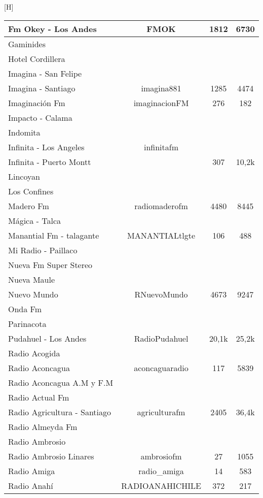 \begin{center}[H]
\begin{longtable}{| l | c | c | c |}
Fm Okey - Los Andes	&	FMOK	&	1812	&	6730	\\ \hline
Gaminides	&		&		&		\\ \hline
Hotel Cordillera	&		&		&		\\ \hline
Imagina - San Felipe	&		&		&		\\ \hline
Imagina - Santiago	&	imagina881	&	1285	&	4474	\\ \hline
Imaginación Fm	&	imaginacionFM	&	276	&	182	\\ \hline
Impacto - Calama	&		&		&		\\ \hline
Indomita	&		&		&		\\ \hline
Infinita - Los Angeles	&	infinitafm	&		&		\\ \hline
Infinita - Puerto Montt	&		&	307	&	10,2k	\\ \hline
Lincoyan	&		&		&		\\ \hline
Los Confines	&		&		&		\\ \hline
Madero Fm	&	radiomaderofm	&	4480	&	8445	\\ \hline
Mágica - Talca	&		&		&		\\ \hline
Manantial Fm - talagante	&	MANANTIALtlgte	&	106	&	488	\\ \hline
Mi Radio - Paillaco	&		&		&		\\ \hline
Nueva Fm Super Stereo	&		&		&		\\ \hline
Nueva Maule	&		&		&		\\ \hline
Nuevo Mundo	&	RNuevoMundo	&	4673	&	9247	\\ \hline
Onda Fm	&		&		&		\\ \hline
Parinacota	&		&		&		\\ \hline
Pudahuel - Los Andes	&	RadioPudahuel	&	20,1k	&	25,2k	\\ \hline
Radio Acogida	&		&		&		\\ \hline
Radio Aconcagua	&	aconcaguaradio	&	117	&	5839	\\ \hline
Radio Aconcagua A.M y F.M	&		&		&		\\ \hline
Radio Actual Fm	&		&		&		\\ \hline
Radio Agricultura - Santiago	&	agriculturafm	&	2405	&	36,4k	\\ \hline
Radio Almeyda Fm	&		&		&		\\ \hline
Radio Ambrosio	&		&		&		\\ \hline
Radio Ambrosio Linares	&	ambrosiofm	&	27	&	1055	\\ \hline
Radio Amiga	&	radio\_amiga	&	14	&	583	\\ \hline
Radio Anahí	&	RADIOANAHICHILE	&	372	&	217	\\ \hline

\end{longtable}
\end{center}
